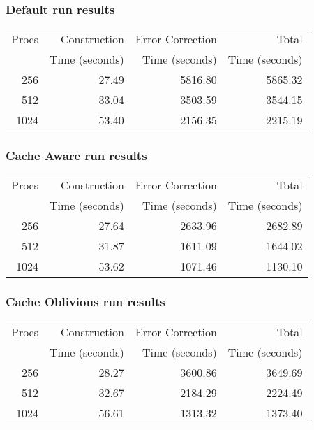 \documentclass[integrals, nointegrals, article, 12pt, a4paper]{article}
\begin{document}
\subsubsection{Default run results}
\label{sec-3-5-2}

\begin{center}
\begin{tabular}{rrrr}
\hline
Procs & Construction & Error Correction & Total\\
 & Time (seconds) & Time (seconds) & Time (seconds)\\
\hline
256 & 27.49 & 5816.80 & 5865.32\\
512 & 33.04 & 3503.59 & 3544.15\\
1024 & 53.40 & 2156.35 & 2215.19\\
\hline
\end{tabular}
\end{center}

\subsubsection{Cache Aware run results}
\label{sec-3-5-3}

\begin{center}
\begin{tabular}{rrrr}
\hline
Procs & Construction & Error Correction & Total\\
 & Time (seconds) & Time (seconds) & Time (seconds)\\
\hline
256 & 27.64 & 2633.96 & 2682.89\\
512 & 31.87 & 1611.09 & 1644.02\\
1024 & 53.62 & 1071.46 & 1130.10\\
\hline
\end{tabular}
\end{center}

\subsubsection{Cache Oblivious run results}
\label{sec-3-5-4}

\begin{center}
\begin{tabular}{rrrr}
\hline
Procs & Construction & Error Correction & Total\\
 & Time (seconds) & Time (seconds) & Time (seconds)\\
\hline
256 & 28.27 & 3600.86 & 3649.69\\
512 & 32.67 & 2184.29 & 2224.49\\
1024 & 56.61 & 1313.32 & 1373.40\\
\hline
\end{tabular}
\end{center}
\end{document}
